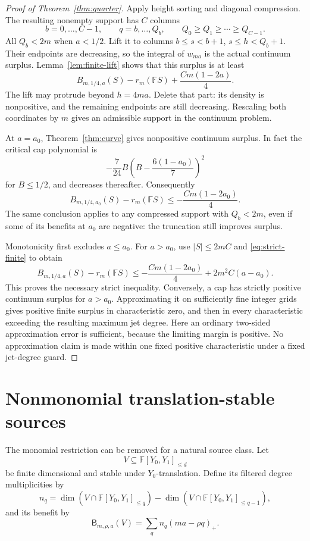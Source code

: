 \documentclass[11pt]{article}
\theoremstyle{remark}\newtheorem{remark}[theorem]{Remark}
\newcommand{\pos}[1]{(#1)_+}
\begin{document}
\begin{proof}[Proof of Theorem~\ref{thm:quarter}]
Apply height sorting and diagonal compression. The resulting nonempty support has $C$ columns
\[
 b=0,\ldots,C-1,\qquad q=b,\ldots,Q_b,
 \qquad Q_0\ge Q_1\ge\cdots\ge Q_{C-1}.
\]
All $Q_b<2m$ when $a<1/2$. Lift it to columns $b\le s<b+1$, $s\le h<Q_b+1$. Their endpoints are decreasing, so the integral of $w_{ma}$ is the actual continuum surplus. Lemma~\ref{lem:finite-lift} shows that this surplus is at least
\[
 B_{m,1/4,a}(S)-r_m(\mathbb F S)+\frac{Cm(1-2a)}4.
\]
The lift may protrude beyond $h=4ma$. Delete that part: its density is nonpositive, and the remaining endpoints are still decreasing. Rescaling both coordinates by $m$ gives an admissible support in the continuum problem.

At $a=a_0$, Theorem~\ref{thm:curve} gives nonpositive continuum surplus. In fact the critical cap polynomial is
\[
 -\frac7{24}B\left(B-\frac{6(1-a_0)}7\right)^2
\]
for $B\le1/2$, and decreases thereafter. Consequently
\begin{equation}\label{eq:strict-finite}
 B_{m,1/4,a_0}(S)-r_m(\mathbb F S)
 \le-\frac{Cm(1-2a_0)}4.
\end{equation}
The same conclusion applies to any compressed support with $Q_b<2m$, even if some of its benefits at $a_0$ are negative: the truncation still improves surplus.

Monotonicity first excludes $a\le a_0$. For $a>a_0$, use $|S|\le2mC$ and \eqref{eq:strict-finite} to obtain
\[
 B_{m,1/4,a}(S)-r_m(\mathbb F S)
 \le-\frac{Cm(1-2a_0)}4+2m^2C(a-a_0).
\]
This proves the necessary strict inequality. Conversely, a cap has strictly positive continuum surplus for $a>a_0$. Approximating it on sufficiently fine integer grids gives positive finite surplus in characteristic zero, and then in every characteristic exceeding the resulting maximum jet degree. Here an ordinary two-sided approximation error is sufficient, because the limiting margin is positive. No approximation claim is made within one fixed positive characteristic under a fixed jet-degree guard.
\end{proof}

\section{Nonmonomial translation-stable sources}\label{sec:degeneration}

The monomial restriction can be removed for a natural source class. Let
\[
 V\subseteq \mathbb F[Y_0,Y_1]_{\le d}
\]
be finite dimensional and stable under $Y_0$-translation. Define its filtered degree multiplicities by
\[
 n_q=\dim(V\cap \mathbb F[Y_0,Y_1]_{\le q})
       -\dim(V\cap \mathbb F[Y_0,Y_1]_{\le q-1}),
\]
and its benefit by
\[
 \mathsf B_{m,\rho,a}(V)=\sum_q n_q\pos{ma-\rho q}.
\]
\end{document}
